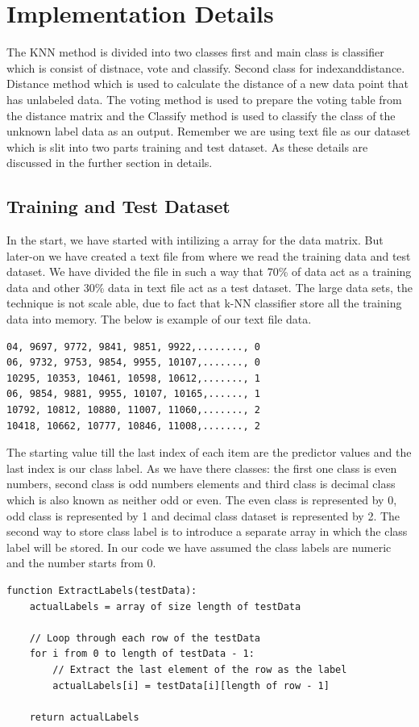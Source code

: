 \documentclass[conference]{IEEEtran}
\begin{document}
\section{Implementation Details}
The KNN method is divided into two classes first and main class is classifier which is consist of distnace, vote and classify. Second class for indexanddistance. Distance method which is used to calculate the distance of a new data point that has unlabeled data. The voting method is used to prepare the voting table from the distance matrix and the Classify method is used to classify the class of the unknown label data as an output. Remember we are using text file as our dataset which is slit into two parts training and test dataset. As these details are discussed in the further section in details. 


\subsection{Training and Test Dataset}
In the start, we have started with intilizing a array for the data matrix. But later-on we have created a text file from where we read the training data and test dataset. We have divided the file in such a way that 70\% of data act as a training data and other 30\% data in text file act as a test dataset. The large data sets, the technique is not scale able, due to fact that k-NN classifier store all the training data into memory. The below is example of our text file data. 
\begin{lstlisting}
04, 9697, 9772, 9841, 9851, 9922,........, 0
06, 9732, 9753, 9854, 9955, 10107,......., 0
10295, 10353, 10461, 10598, 10612,......., 1
06, 9854, 9881, 9955, 10107, 10165,......, 1
10792, 10812, 10880, 11007, 11060,......., 2
10418, 10662, 10777, 10846, 11008,......., 2
\end{lstlisting}
The starting value till the last index of each item are the predictor values and the last index is our class label. As we have there classes: the first one class is even numbers, second class is odd numbers elements and third class is decimal class which is also known as neither odd or even. The even class is represented by 0, odd class is represented by 1 and decimal class dataset is represented by 2. The second way to store class label is to introduce a separate array in which the class label will be stored. In our code we have assumed the class labels are numeric and the number starts from 0. 
\begin{lstlisting}
function ExtractLabels(testData):
    actualLabels = array of size length of testData
    
    // Loop through each row of the testData
    for i from 0 to length of testData - 1:
        // Extract the last element of the row as the label
        actualLabels[i] = testData[i][length of row - 1]
    
    return actualLabels
\end{lstlisting}
\end{document}
